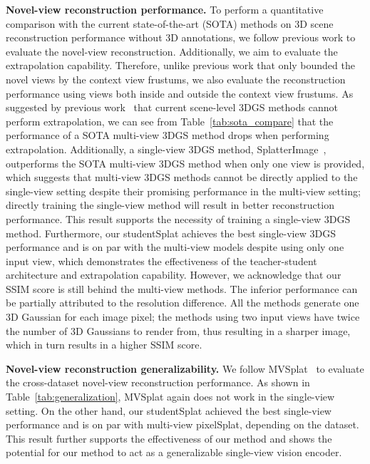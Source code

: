 \documentclass{article} %
\begin{document}
\textbf{Novel-view reconstruction performance.} To perform a quantitative comparison with the current state-of-the-art (SOTA) methods on 3D scene reconstruction performance without 3D annotations, we follow previous work to evaluate the novel-view reconstruction. Additionally, we aim to evaluate the extrapolation capability. Therefore, unlike previous work that only bounded the novel views by the context view frustums, we also evaluate the reconstruction performance using views both inside and outside the context view frustums. As suggested by previous work~\citep{charatan2024pixelsplat} that current scene-level 3DGS methods cannot perform extrapolation, we can see from Table~\ref{tab:sota_compare} that the performance of a SOTA multi-view 3DGS method drops when performing extrapolation. Additionally, a single-view 3DGS method, SplatterImage~\citep{szymanowicz2024splatter}, outperforms the SOTA multi-view 3DGS method when only one view is provided, which suggests that multi-view 3DGS methods cannot be directly applied to the single-view setting despite their promising performance in the multi-view setting; directly training the single-view method will result in better reconstruction performance. This result supports the necessity of training a single-view 3DGS method. Furthermore, our studentSplat achieves the best single-view 3DGS performance and is on par with the multi-view models despite using only one input view, which demonstrates the effectiveness of the teacher-student architecture and extrapolation capability. However, we acknowledge that our SSIM score is still behind the multi-view methods. The inferior performance can be partially attributed to the resolution difference. All the methods generate one 3D Gaussian for each image pixel; the methods using two input views have twice the number of 3D Gaussians to render from, thus resulting in a sharper image, which in turn results in a higher SSIM score.


\textbf{Novel-view reconstruction generalizability.} We follow MVSplat~\citep{chen2024mvsplat} to evaluate the cross-dataset novel-view reconstruction performance. As shown in Table~\ref{tab:generalization}, MVSplat again does not work in the single-view setting. On the other hand, our studentSplat achieved the best single-view performance and is on par with multi-view pixelSplat, depending on the dataset. This result further supports the effectiveness of our method and shows the potential for our method to act as a generalizable single-view vision encoder.
\end{document}
